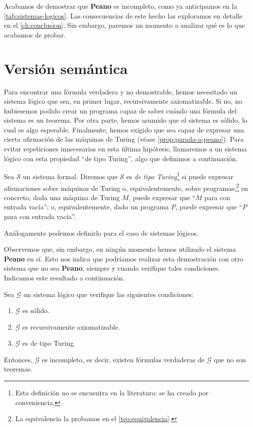 Acabamos de demostrar que \textbf{Peano} es incompleto, como ya anticipamos en la \cref{tab:sistemas-logicos}. Las consecuencias de este hecho las exploramos en detalle en el \cref{ch:conclusion}. Sin embargo, paremos un momento a analizar qué es lo que acabamos de probar.

\section{Versión semántica}\label{sec:version-semantica}

Para encontrar una fórmula verdadera y no demostrable, hemos necesitado un sistema lógico que sea, en primer lugar, recursivamente axiomatizable. Si no, no hubiesemos podido crear un programa capaz de saber cuándo una fórmula del sistema es un teorema. Por otra parte, hemos asumido que el sistema es sólido, lo cual es algo esperable. Finalmente, hemos exigido que sea capaz de expresar una cierta afirmación de las máquinas de Turing (véase \cref{prop:parada-a-peano}). Para evitar repeticiones innecesarias en esta última hipótesis, llamaremos a un sistema lógico con esta propiedad ``de tipo Turing'', algo que definimos a continuación.

\begin{definicion}
Sea $\mathcal{S}$ un sistema formal. Diremos que $\mathcal{S}$ es \emph{de tipo Turing}\footnote{Esta definición no se encuentra en la literatura: se ha creado por conveniencia.} si puede expresar afirmaciones sobre máquinas de Turing o, equivalentemente, sobre programas;\footnote{La equivalencia la probamos en el \cref{teo:equivalencia}.} en concreto, dada una máquina de Turing $M$, puede expresar que ``$M$ para con entrada vacía''; o, equivalentemente, dado un programa $P$, puede expresar que ``$P$ para con entrada vacía''.

Análogamente podemos definirlo para el caso de sistemas lógicos.
\end{definicion}

Observemos que, sin embargo, en ningún momento hemos utilizado el sistema \textbf{Peano} en sí. Esto nos indica que podríamos realizar esta demostración con otro sistema que no sea \textbf{Peano}, siempre y cuando verifique tales condiciones. Indicamos este resultado a continuación.

\begin{teorema}\label{teo:incompletitud-semantica}
Sea $\mathcal{G}$ un sistema lógico que verifique las siguientes condiciones:
\begin{enumerate}
    \item $\mathcal{G}$ es sólido.
    \item $\mathcal{G}$ es recursivamente axiomatizable.
    \item $\mathcal{G}$ es de tipo Turing.
\end{enumerate}
Entonces, $\mathcal{G}$ es incompleto, es decir, existen fórmulas verdaderas de $\mathcal{G}$ que no son teoremas.
\end{teorema}

